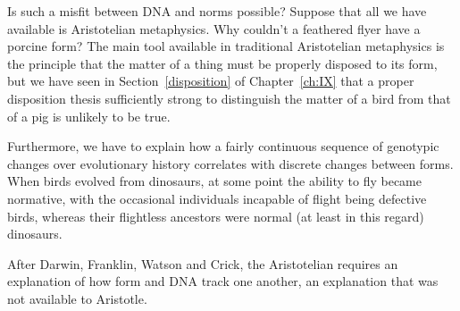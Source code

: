 Is such a misfit between DNA and norms possible? Suppose that all we have available is Aristotelian metaphysics.
Why couldn't a feathered flyer have a porcine form? The main tool available in traditional Aristotelian metaphysics
is the principle that the matter of a thing must be properly disposed to its form, but we have seen in Section~\ref{disposition}
of Chapter~\ref{ch:IX} that a proper disposition thesis sufficiently strong to distinguish the matter of a bird from 
that of a pig is unlikely to be true. 

Furthermore, we have to explain how a fairly continuous sequence of genotypic changes over evolutionary history 
correlates with discrete changes between forms. When birds evolved from dinosaurs, at some point the ability to 
fly became normative, with the occasional individuals incapable of flight being defective birds, whereas their flightless 
ancestors were normal (at least in this regard) dinosaurs. 

After Darwin, Franklin, Watson and Crick, the Aristotelian requires an explanation of how 
form and DNA track one another, an explanation that was not available to Aristotle.

